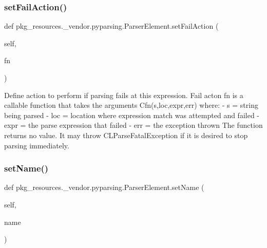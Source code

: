 \subsubsection{\texorpdfstring{set\+Fail\+Action()}{setFailAction()}}
{\footnotesize\ttfamily def pkg\+\_\+resources.\+\_\+vendor.\+pyparsing.\+Parser\+Element.\+set\+Fail\+Action (\begin{DoxyParamCaption}\item[{}]{self,  }\item[{}]{fn }\end{DoxyParamCaption})}

\begin{DoxyVerb}Define action to perform if parsing fails at this expression.
   Fail acton fn is a callable function that takes the arguments
   C{fn(s,loc,expr,err)} where:
    - s = string being parsed
    - loc = location where expression match was attempted and failed
    - expr = the parse expression that failed
    - err = the exception thrown
   The function returns no value.  It may throw C{L{ParseFatalException}}
   if it is desired to stop parsing immediately.\end{DoxyVerb}
 \mbox{\label{classpkg__resources_1_1__vendor_1_1pyparsing_1_1ParserElement_a65024e7147c8b3d4fd3d0d161429737f}} 
\subsubsection{\texorpdfstring{set\+Name()}{setName()}}
{\footnotesize\ttfamily def pkg\+\_\+resources.\+\_\+vendor.\+pyparsing.\+Parser\+Element.\+set\+Name (\begin{DoxyParamCaption}\item[{}]{self,  }\item[{}]{name }\end{DoxyParamCaption})}

